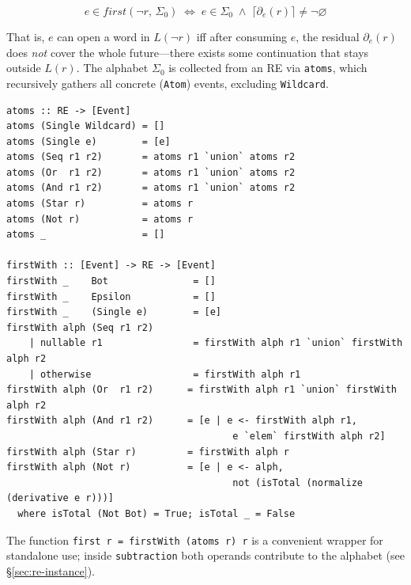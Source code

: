 \documentclass[acmsmall,screen]{acmart}
\newcommand{\univ}{\neg\varnothing}
\begin{document}
\begin{equation}
  e \in \mathit{first}(\neg r,\,\Sigma_0)
  \;\iff\;
  e \in \Sigma_0
  \;\wedge\;
  \lceil\partial_e(r)\rceil \neq \univ
  \label{eq:first-not}
\end{equation}

That is, $e$ can open a word in $L(\neg r)$ iff after consuming $e$,
the residual $\partial_e(r)$ does \emph{not} cover the whole future---there
exists some continuation that stays outside $L(r)$.
The alphabet $\Sigma_0$ is collected from an RE via \lstinline{atoms},
which recursively gathers all concrete (\lstinline{Atom}) events,
excluding \lstinline{Wildcard}.

\begin{lstlisting}
atoms :: RE -> [Event]
atoms (Single Wildcard) = []
atoms (Single e)        = [e]
atoms (Seq r1 r2)       = atoms r1 `union` atoms r2
atoms (Or  r1 r2)       = atoms r1 `union` atoms r2
atoms (And r1 r2)       = atoms r1 `union` atoms r2
atoms (Star r)          = atoms r
atoms (Not r)           = atoms r
atoms _                 = []

firstWith :: [Event] -> RE -> [Event]
firstWith _    Bot               = []
firstWith _    Epsilon           = []
firstWith _    (Single e)        = [e]
firstWith alph (Seq r1 r2)
    | nullable r1                = firstWith alph r1 `union` firstWith alph r2
    | otherwise                  = firstWith alph r1
firstWith alph (Or  r1 r2)      = firstWith alph r1 `union` firstWith alph r2
firstWith alph (And r1 r2)      = [e | e <- firstWith alph r1,
                                        e `elem` firstWith alph r2]
firstWith alph (Star r)         = firstWith alph r
firstWith alph (Not r)          = [e | e <- alph,
                                        not (isTotal (normalize (derivative e r)))]
  where isTotal (Not Bot) = True; isTotal _ = False
\end{lstlisting}

\noindent
The function \lstinline{first r = firstWith (atoms r) r} is a convenient
wrapper for standalone use; inside \lstinline{subtraction} both operands
contribute to the alphabet (see \S\ref{sec:re-instance}).
\end{document}

